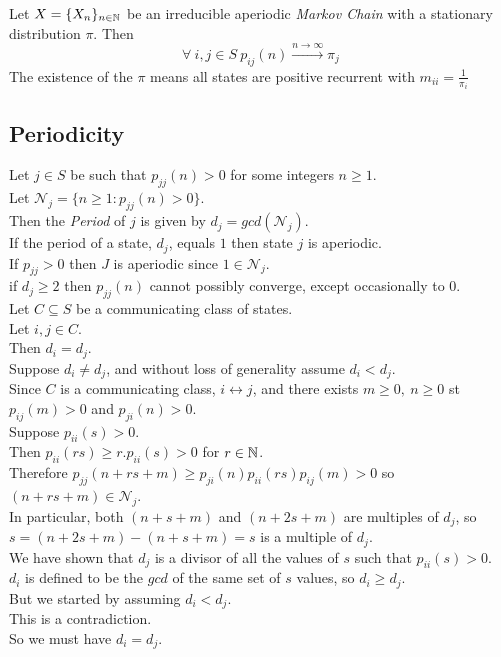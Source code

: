 \documentclass[11pt,a4paper]{article}
\begin{document}
\theorem{}
Let $X=\{X_n\}_{n\in\mathbb{N}}$ be an irreducible aperiodic \textit{Markov Chain} with a stationary distribution $\pi$. Then
$$\forall\ i,j\in S\ p_{ij}(n)\xrightarrow{n\to\infty}\pi_j$$
\nb The existence of the $\pi$ means all states are positive recurrent with $m_{ii}=\frac{1}{\pi_i}$

\subsection{Periodicity}

Let $j\in S$ be such that $p_{jj}(n)>0$ for some integers $n\geq 1$.\\
Let $\mathcal{N}_j=\{n\geq 1:p_{jj}(n)>0\}$.\\
Then the \textit{Period} of $j$ is given by $d_j=gcd(\mathcal{N}_j)$.\\

If the period of a state, $d_j$, equals $1$ then state $j$ is aperiodic.\\

\remark{}
If $p_{jj}>0$ then $J$ is aperiodic since $1\in\mathcal{N}_j$.\\

\remark{}
if $d_j\geq2$ then $p_{jj}(n)$ cannot possibly converge, except occasionally to 0.\\

Let $C\subseteq S$ be a communicating class of states.\\
Let $i,j\in C$.\\
Then $d_i=d_j$.\\

Suppose $d_i\neq d_j$, and without loss of generality assume $d_i<d_j$.\\
Since $C$ is a communicating class, $i\leftrightarrow j$, and there exists $m\geq0,\ n\geq0$ st $p_{ij}(m)>0$ and $p_{ji}(n)>0$.\\
Suppose $p_{ii}(s)>0$.\\
Then $p_{ii}(rs)\geq r.p_{ii}(s)>0$ for $r\in\mathbb{N}$.\\
Therefore $p_{jj}(n+rs+m)\geq p_{ji}(n)p_{ii}(rs)p_{ij}(m)>0$ so $(n+rs+m)\in\mathcal{N}_j$.\\
In particular, both $(n+s+m)$ and $(n+2s+m)$ are multiples of $d_j$, so $s=(n+2s+m)-(n+s+m)=s$ is a multiple of $d_j$.\\
We have shown that $d_j$ is a divisor of all the values of $s$ such that $p_{ii}(s)>0$.\\
$d_i$ is defined to be the $gcd$ of the same set of $s$ values, so $d_i\geq d_j$.\\
But we started by assuming $d_i<d_j$.\\
This is a contradiction.\\
So we must have $d_i=d_j$.\\
\end{document}
